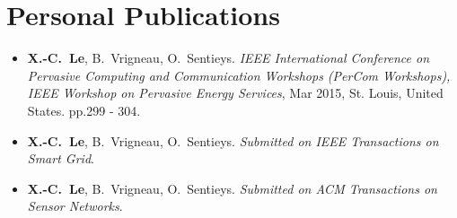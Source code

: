 
\chapter*{Personal Publications} %
\label{Publication}



\begin{itemize}

\item \textbf{X.-C.~Le}, B.~Vrigneau, O.~Sentieys.
\newblock \emph{IEEE International Conference on Pervasive Computing and Communication Workshops (PerCom Workshops), IEEE Workshop on Pervasive Energy Services}, Mar 2015, St. Louis, United States. pp.299 - 304.{}
\item \textbf{X.-C.~Le}, B.~Vrigneau, O.~Sentieys.
\newblock \emph{Submitted on IEEE Transactions on Smart Grid}.{}
\item \textbf{X.-C.~Le}, B.~Vrigneau, O.~Sentieys.
\newblock \emph{Submitted on ACM Transactions on Sensor Networks}.{}
\end{itemize}